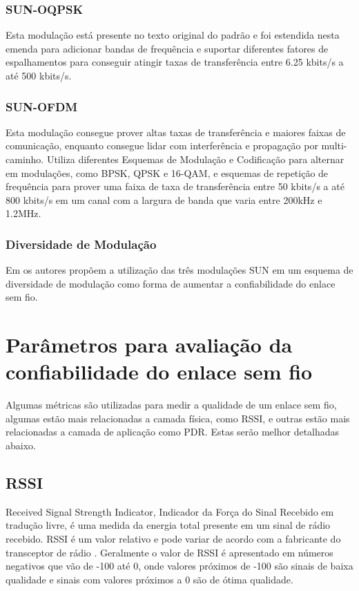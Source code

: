 \subsubsection*{SUN-OQPSK}
Esta modulação está presente no texto original do padrão e foi estendida nesta emenda para adicionar bandas de frequência e suportar diferentes fatores de espalhamentos para conseguir atingir taxas de transferência entre 6.25 kbits/s a até 500 kbits/s.
\subsubsection*{SUN-OFDM}
Esta modulação consegue prover altas taxas de transferência e maiores faixas de comunicação, enquanto consegue lidar com interferência e propagação por multi-caminho. Utiliza diferentes Esquemas de Modulação e Codificação para alternar em modulações, como BPSK, QPSK e 16-QAM, e esquemas de repetição de frequência para prover uma faixa de taxa de transferência entre 50 kbits/s a até 800 kbits/s em um canal com a largura de banda que varia entre 200kHz e 1.2MHz.

\subsubsection*{Diversidade de Modulação}
Em \cite{gomes2020improving} os autores propõem a utilização das três modulações SUN em um esquema de diversidade de modulação como forma de aumentar a confiabilidade do enlace sem fio.

\section{Parâmetros para avaliação da confiabilidade do enlace sem fio}
\label{paramSF}
Algumas métricas são utilizadas para medir a qualidade de um enlace sem fio, algumas estão mais relacionadas a camada física, como RSSI, e outras estão mais relacionadas a camada de aplicação como PDR. Estas serão melhor detalhadas abaixo.
\subsection*{RSSI}
Received Signal Strength Indicator, Indicador da Força do Sinal Recebido em tradução livre, é uma medida da energia total presente em um sinal de rádio recebido. RSSI é um valor relativo e pode variar de acordo com a fabricante do transceptor de rádio \cite{UNDERSTANDING_RSSI}. Geralmente o valor de RSSI é apresentado em números negativos que vão de -100 até 0, onde valores próximos de -100 são sinais de baixa qualidade e sinais com valores próximos a 0 são de ótima qualidade.

